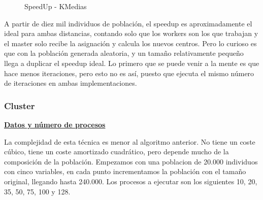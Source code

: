 			\begin{figure}[!h]
			\centering
			\caption{SpeedUp - KMedias}
			\end{figure}
			
			A partir de diez mil individuos de población, el speedup es aproximadamente el ideal para ambas distancias, contando solo que los workers son los que trabajan y el master solo recibe la asignación y calcula los nuevos centros. Pero lo curioso es que con la población generada aleatoria, y un tamaño relativamente pequeño llega a duplicar el speedup ideal. Lo primero que se puede venir a la mente es que hace menos iteraciones, pero esto no es así, puesto que ejecuta el mismo número de iteraciones en ambas implementaciones. 
			
			
			
		
			
					
		\subsubsection{Cluster}
		
			\begin{flushleft}
			\begin{mdframed}[roundcorner=5pt]			
				\textbf{\underline{Datos y número de procesos}}
				\vspace{0.1cm}
				
				\scriptsize	
				La complejidad de esta técnica es menor al algoritmo anterior. No tiene un coste cúbico, tiene un coste amortizado cuadrático, pero depende mucho de la composición de la población. Empezamos con una poblacion de 20.000 individuos con cinco variables, en cada punto incrementamos la población con el tamaño original, llegando hasta 240.000. Los procesos a ejecutar son los siguientes 10, 20, 35, 50, 75, 100 y 128.
			\end{mdframed}
			\end{flushleft}	

